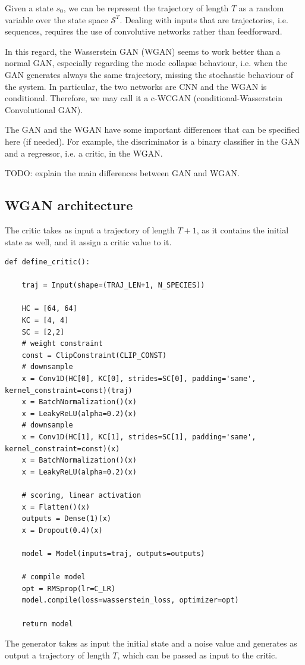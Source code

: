 \documentclass{article}
\begin{document}
Given a state $s_0$, we can be represent the trajectory of length $T$ as a random variable over the state space $\mathcal{S}^T$. Dealing with inputs that are trajectories, i.e. sequences, requires the use of convolutive networks rather than feedforward. %

In this regard, the Wasserstein GAN (WGAN) seems to work better than a normal GAN, especially regarding the mode collapse behaviour, i.e. when the GAN generates always the same trajectory, missing the stochastic behaviour of the system. 
In particular, the two networks are CNN and the WGAN is conditional. Therefore, we may call it a c-WCGAN (conditional-Wasserstein Convolutional GAN).

The GAN and the WGAN have some important differences that can be specified here (if needed). For example, the discriminator is a binary classifier in the GAN and a regressor, i.e. a critic, in the WGAN.

TODO: explain the main differences between GAN and WGAN.

\subsection{WGAN architecture}

The critic takes as input a trajectory of length $T+1$, as it contains the initial state as well, and it assign a critic value to it. 
\begin{lstlisting}
def define_critic():
	
	traj = Input(shape=(TRAJ_LEN+1, N_SPECIES)) 
		
	HC = [64, 64]
	KC = [4, 4]
	SC = [2,2]
	# weight constraint
	const = ClipConstraint(CLIP_CONST)
	# downsample 
	x = Conv1D(HC[0], KC[0], strides=SC[0], padding='same', kernel_constraint=const)(traj)
	x = BatchNormalization()(x)
	x = LeakyReLU(alpha=0.2)(x)
	# downsample 
	x = Conv1D(HC[1], KC[1], strides=SC[1], padding='same', kernel_constraint=const)(x)
	x = BatchNormalization()(x)
	x = LeakyReLU(alpha=0.2)(x)

	# scoring, linear activation
	x = Flatten()(x)
	outputs = Dense(1)(x)
	x = Dropout(0.4)(x)

	model = Model(inputs=traj, outputs=outputs)

	# compile model
	opt = RMSprop(lr=C_LR)
	model.compile(loss=wasserstein_loss, optimizer=opt)

	return model
\end{lstlisting}
The generator takes as input the initial state and a noise value and generates as output a trajectory of length $T$, which can be passed as input to the critic.
\end{document}
